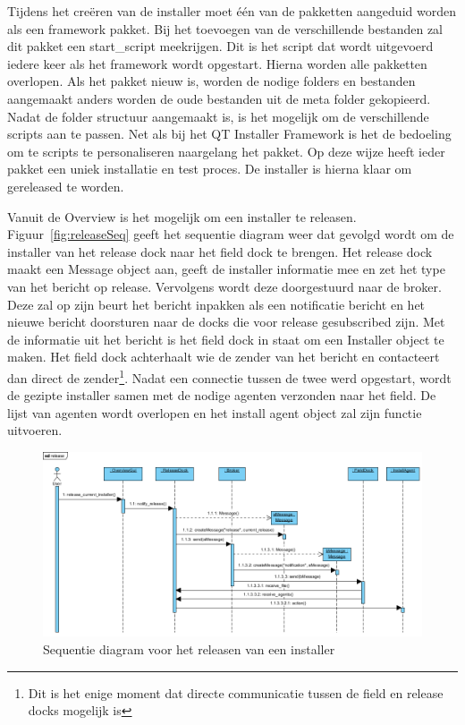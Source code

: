 Tijdens het creëren van de installer moet één van de pakketten aangeduid worden als een framework pakket.
Bij het toevoegen van de verschillende bestanden zal dit pakket een start\_script meekrijgen.
Dit is het script dat wordt uitgevoerd iedere keer als het framework wordt opgestart.
Hierna worden alle pakketten overlopen.
Als het pakket nieuw is, worden de nodige folders en bestanden aangemaakt anders worden de oude bestanden uit de meta folder gekopieerd.
Nadat de folder structuur aangemaakt is, is het mogelijk om de verschillende scripts aan te passen.
Net als bij het QT Installer Framework is het de bedoeling om te scripts te personaliseren naargelang het pakket.
Op deze wijze heeft ieder pakket een uniek installatie en test proces.
De installer is hierna klaar om gereleased te worden.

Vanuit de Overview is het mogelijk om een installer te releasen.
Figuur~\vref{fig:releaseSeq} geeft het sequentie diagram weer dat gevolgd wordt om de installer van het release dock naar het field dock te brengen.
Het release dock maakt een Message object aan, geeft de installer informatie mee en zet het type van het bericht op release.
Vervolgens wordt deze doorgestuurd naar de broker.
Deze zal op zijn beurt het bericht inpakken als een notificatie bericht en het nieuwe bericht doorsturen naar de docks die voor release gesubscribed zijn.
Met de informatie uit het bericht is het field dock in staat om een Installer object te maken.
Het field dock achterhaalt wie de zender van het bericht en contacteert dan direct de zender\footnote{Dit is het enige moment dat directe communicatie tussen de field en release docks mogelijk is}.
Nadat een connectie tussen de twee werd opgestart, wordt de gezipte installer samen met de nodige agenten verzonden naar het field.
De lijst van agenten wordt overlopen en het install agent object zal zijn functie uitvoeren.

\begin{figure}
\includegraphics[width=\textwidth,height=\textheight,keepaspectratio]{afbeelding/seqRelease.png}
\centering
\caption{Sequentie diagram voor het releasen van een installer}
\label{fig:releaseSeq}
\end{figure}

